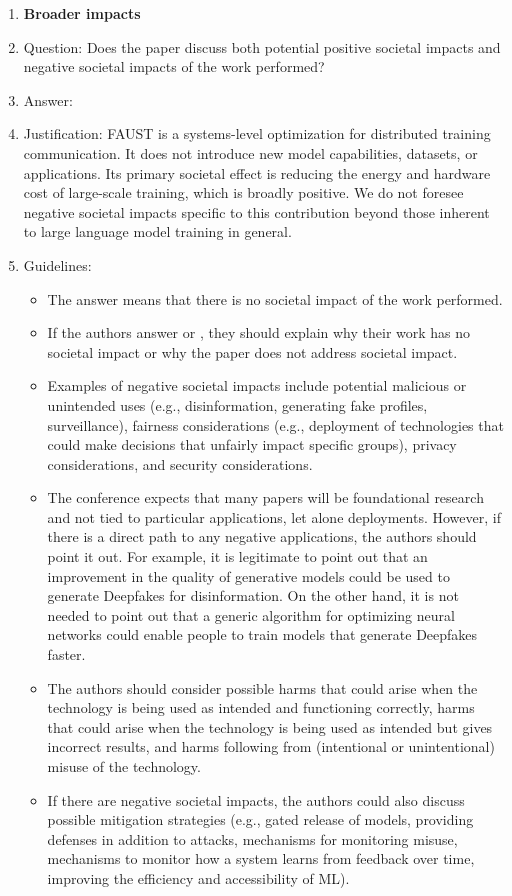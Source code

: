 \documentclass{article}
\begin{document}
\begin{enumerate}
\item {\bf Broader impacts}
    \item[] Question: Does the paper discuss both potential positive societal impacts and negative societal impacts of the work performed?
    \item[] Answer: \answerNA{}
    \item[] Justification: FAUST is a systems-level optimization for distributed training communication. It does not introduce new model capabilities, datasets, or applications. Its primary societal effect is reducing the energy and hardware cost of large-scale training, which is broadly positive. We do not foresee negative societal impacts specific to this contribution beyond those inherent to large language model training in general.
    \item[] Guidelines:
    \begin{itemize}
        \item The answer \answerNA{} means that there is no societal impact of the work performed.
        \item If the authors answer \answerNA{} or \answerNo, they should explain why their work has no societal impact or why the paper does not address societal impact.
        \item Examples of negative societal impacts include potential malicious or unintended uses (e.g., disinformation, generating fake profiles, surveillance), fairness considerations (e.g., deployment of technologies that could make decisions that unfairly impact specific groups), privacy considerations, and security considerations.
        \item The conference expects that many papers will be foundational research and not tied to particular applications, let alone deployments. However, if there is a direct path to any negative applications, the authors should point it out. For example, it is legitimate to point out that an improvement in the quality of generative models could be used to generate Deepfakes for disinformation. On the other hand, it is not needed to point out that a generic algorithm for optimizing neural networks could enable people to train models that generate Deepfakes faster.
        \item The authors should consider possible harms that could arise when the technology is being used as intended and functioning correctly, harms that could arise when the technology is being used as intended but gives incorrect results, and harms following from (intentional or unintentional) misuse of the technology.
        \item If there are negative societal impacts, the authors could also discuss possible mitigation strategies (e.g., gated release of models, providing defenses in addition to attacks, mechanisms for monitoring misuse, mechanisms to monitor how a system learns from feedback over time, improving the efficiency and accessibility of ML).
    \end{itemize}
    

\end{enumerate}
\end{document}

